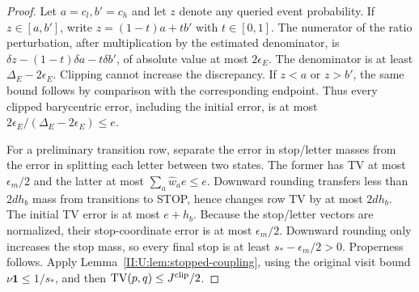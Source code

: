 \begin{proof}
Let $a=c_l,b'=c_h$ and let $z$ denote any queried event probability.
If $z\in[a,b']$, write $z=(1-t)a+tb'$ with $t\in[0,1]$.
The numerator of the ratio perturbation, after multiplication by the
estimated denominator, is
$\delta z-(1-t)\delta a-t\delta b'$, of absolute value at most
$2\epsilon_E$. The denominator is at least
$\Delta_E-2\epsilon_E$. Clipping cannot increase the discrepancy.
If $z<a$ or $z>b'$, the same bound follows by comparison with the
corresponding endpoint. Thus every clipped barycentric error,
including the initial error, is at most
$2\epsilon_E/(\Delta_E-2\epsilon_E)\le e$.

For a preliminary transition row, separate the error in stop/letter
masses from the error in splitting each letter between two states.
The former has TV at most $\epsilon_m/2$ and the latter at most
$\sum_a\widehat w_a e\le e$. Downward rounding transfers less than
$2dh_b$ mass from transitions to STOP, hence changes row TV by at most
$2dh_b$. The initial TV error is at most $e+h_b$.
Because the stop/letter vectors are normalized, their stop-coordinate
error is at most $\epsilon_m/2$. Downward rounding only increases the
stop mass, so every final stop is at least
$s_*-\epsilon_m/2>0$. Properness follows.
Apply Lemma~\ref{II:U:lem:stopped-coupling}, using the original visit bound
$\nu\mathbf1\le1/s_*$, and then
$\operatorname{TV}(p,q)\le J^{\rm clip}/2$.
\end{proof}
